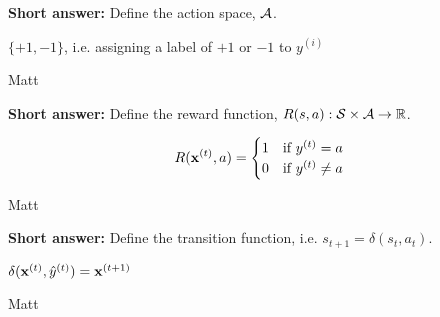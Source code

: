 \begin{parts}
\begin{subparts}
    
\subpart[1] \textbf{Short answer:} Define the action space, $\mathcal{A}$.
    \begin{tcolorbox}[fit,height=1.5cm, width=6cm, blank, borderline={1pt}{-2pt}]
    \end{tcolorbox}
    \begin{soln}
    $\{+1, -1\}$, i.e. assigning a label of $+1$ or $-1$ to $y^{(i)}$
    \end{soln}
    \begin{qauthor}   Matt    \end{qauthor}
    
\subpart[1] \textbf{Short answer:} Define the reward function, $R(s, a) : \mathcal{S} \times \mathcal{A} \rightarrow \mathbb{R}$.
    \begin{tcolorbox}[fit,height=1.9cm, width=8cm, blank, borderline={1pt}{-2pt}]
    \end{tcolorbox}
    \begin{soln}
    \begin{align*}
        R(\mathbf{x}^{(t)}, a) = \begin{cases}
        1 & \text{if } y^{(t)} = a \\
        0 & \text{if } y^{(t)} \neq a 
        \end{cases}
    \end{align*}
    \end{soln}
    \begin{qauthor}   Matt    \end{qauthor}
    
\subpart[1] \textbf{Short answer:} Define the transition function, i.e. $s_{t+1} = \delta(s_t, a_t)$.
    \begin{tcolorbox}[fit,height=1.9cm, width=8cm, blank, borderline={1pt}{-2pt}]
    \end{tcolorbox}
    \begin{soln}
    $\delta(\mathbf{x}^{(t)}, \hat{y}^{(t)}) = \mathbf{x}^{(t+1)}$
    \end{soln}
    \begin{qauthor}   Matt    \end{qauthor}


\end{subparts}
\end{parts}
